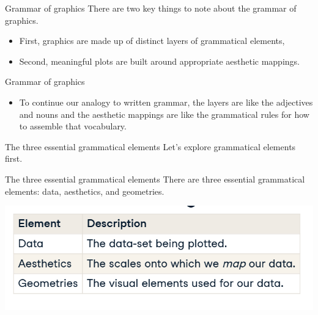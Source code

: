 \documentclass[
  ignorenonframetext,
]{beamer}
\providecommand{\tightlist}{%
  \setlength{\itemsep}{0pt}\setlength{\parskip}{0pt}}
\begin{document}
\begin{frame}{Grammar of graphics}
\label{grammar-of-graphics-2}
There are two key things to note about the grammar of graphics.

\begin{itemize}
\item
  First, graphics are made up of distinct layers of grammatical
  elements,
\item
  Second, meaningful plots are built around appropriate aesthetic
  mappings.
\end{itemize}
\end{frame}

\begin{frame}{Grammar of graphics}
\label{grammar-of-graphics-3}
\begin{itemize}
\tightlist
\item
  To continue our analogy to written grammar, the layers are like the
  adjectives and nouns and the aesthetic mappings are like the
  grammatical rules for how to assemble that vocabulary.
\end{itemize}
\end{frame}

\begin{frame}{The three essential grammatical elements}
\label{the-three-essential-grammatical-elements}
Let's explore grammatical elements first.
\end{frame}

\begin{frame}{The three essential grammatical elements}
\label{the-three-essential-grammatical-elements-1}
There are three essential grammatical elements: data, aesthetics, and
geometries.

\includegraphics{../images/im122.png}
\end{frame}
\end{document}
